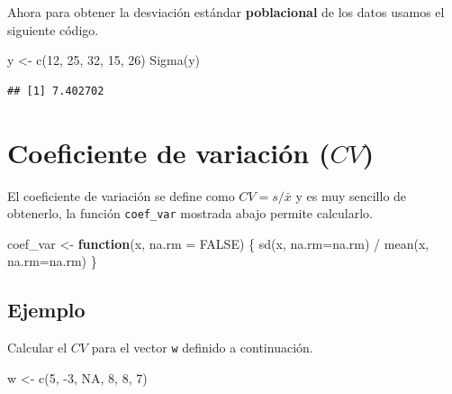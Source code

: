 \documentclass[
]{book}
\makeatletter
\newenvironment{Shaded}{\begin{snugshade}}{\end{snugshade}}
\newcommand{\AttributeTok}[1]{\textcolor[rgb]{0.77,0.63,0.00}{#1}}
\newcommand{\ConstantTok}[1]{\textcolor[rgb]{0.00,0.00,0.00}{#1}}
\newcommand{\ControlFlowTok}[1]{\textcolor[rgb]{0.13,0.29,0.53}{\textbf{#1}}}
\newcommand{\DecValTok}[1]{\textcolor[rgb]{0.00,0.00,0.81}{#1}}
\newcommand{\FunctionTok}[1]{\textcolor[rgb]{0.00,0.00,0.00}{#1}}
\newcommand{\NormalTok}[1]{#1}
\newcommand{\OtherTok}[1]{\textcolor[rgb]{0.56,0.35,0.01}{#1}}
\newcommand{\SpecialCharTok}[1]{\textcolor[rgb]{0.00,0.00,0.00}{#1}}
\newenvironment{kframe}{%
\medskip{}
\setlength{\fboxsep}{.8em}
 \def\at@end@of@kframe{}%
 \ifinner\ifhmode%
  \def\at@end@of@kframe{\end{minipage}}%
  \begin{minipage}{\columnwidth}%
 \fi\fi%
 \def\FrameCommand##1{\hskip\@totalleftmargin \hskip-\fboxsep
 \colorbox{shadecolor}{##1}\hskip-\fboxsep
     \hskip-\linewidth \hskip-\@totalleftmargin \hskip\columnwidth}%
 \MakeFramed {\advance\hsize-\width
   \@totalleftmargin\z@ \linewidth\hsize
   \@setminipage}}%
 {\par\unskip\endMakeFramed%
 \at@end@of@kframe}
\renewenvironment{Shaded}{\begin{kframe}}{\end{kframe}}
\makeatother
\begin{document}
Ahora para obtener la desviación estándar \textbf{poblacional} de los datos usamos el siguiente código.

\begin{Shaded}
\begin{Highlighting}[]
\NormalTok{y }\OtherTok{\textless{}{-}} \FunctionTok{c}\NormalTok{(}\DecValTok{12}\NormalTok{, }\DecValTok{25}\NormalTok{, }\DecValTok{32}\NormalTok{, }\DecValTok{15}\NormalTok{, }\DecValTok{26}\NormalTok{)}
\FunctionTok{Sigma}\NormalTok{(y)}
\end{Highlighting}
\end{Shaded}

\begin{verbatim}
## [1] 7.402702
\end{verbatim}

\hypertarget{coeficiente-de-variaciuxf3n-cv}{%
\section{\texorpdfstring{Coeficiente de variación (\(CV\)) }{Coeficiente de variación (CV) }}\label{coeficiente-de-variaciuxf3n-cv}}

El coeficiente de variación se define como \(CV=s/\bar{x}\) y es muy sencillo de obtenerlo, la función \texttt{coef\_var} mostrada abajo permite calcularlo.

\begin{Shaded}
\begin{Highlighting}[]
\NormalTok{coef\_var }\OtherTok{\textless{}{-}} \ControlFlowTok{function}\NormalTok{(x, }\AttributeTok{na.rm =} \ConstantTok{FALSE}\NormalTok{) \{}
  \FunctionTok{sd}\NormalTok{(x, }\AttributeTok{na.rm=}\NormalTok{na.rm) }\SpecialCharTok{/} \FunctionTok{mean}\NormalTok{(x, }\AttributeTok{na.rm=}\NormalTok{na.rm)}
\NormalTok{\}}
\end{Highlighting}
\end{Shaded}

\hypertarget{ejemplo-41}{%
\subsection*{Ejemplo}\label{ejemplo-41}}

Calcular el \(CV\) para el vector \texttt{w} definido a continuación.

\begin{Shaded}
\begin{Highlighting}[]
\NormalTok{w }\OtherTok{\textless{}{-}} \FunctionTok{c}\NormalTok{(}\DecValTok{5}\NormalTok{, }\SpecialCharTok{{-}}\DecValTok{3}\NormalTok{, }\ConstantTok{NA}\NormalTok{, }\DecValTok{8}\NormalTok{, }\DecValTok{8}\NormalTok{, }\DecValTok{7}\NormalTok{)}
\end{Highlighting}
\end{Shaded}
\end{document}

